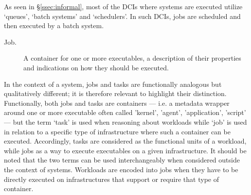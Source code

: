 \documentclass{sig-alternate}
\begin{document}
\begin{description}

\end{description}

As seen in \S\ref{ssec:informal}, most of the DCIs where \pilotjobs systems
are executed utilize `queues', `batch systems' and `schedulers'. In such DCIs,
jobs are scheduled and then executed by a batch system.

\begin{description}

\item[Job.] A container for one or more executables, a description of
their properties and indications on how they should be executed.

\end{description}

In the context of a \pilotjob system, jobs and tasks are functionally
analogous but qualitatively different; it is therefore relevant to
highlight their distinction. Functionally, both jobs and tasks are
containers --- i.e. a metadata wrapper around one or more executable
often called 'kernel', 'agent', 'application', 'script' --- but the term
`task' is used when reasoning about workloads while `job' is used in
relation to a specific type of infrastructure where such a container can
be executed. Accordingly, tasks are considered as the functional units
of a workload, while jobs as a way to execute executables on a given
infrastructure. It should be noted that the two terms can be used
interchangeably when considered outside the context of \pilotjob
systems. Workloads are encoded into jobs when they have to be directly
executed on infrastructures that support or require that type of
container.
\end{document}
